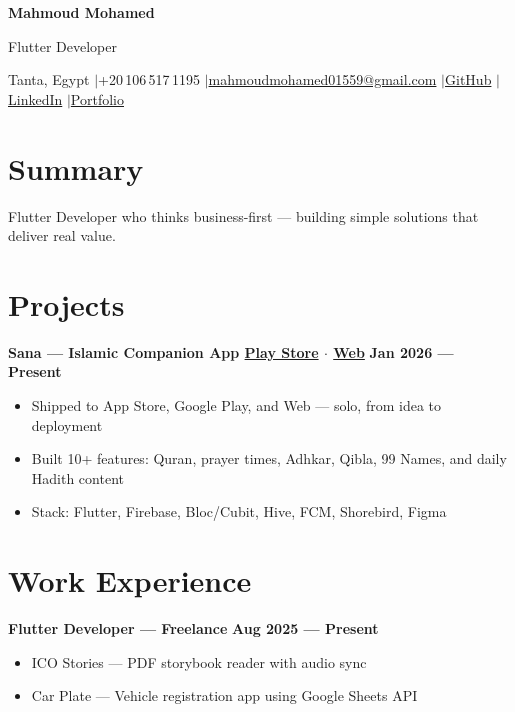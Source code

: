 \documentclass[a4paper,11pt]{article}
\newcommand{\entry}[2]{%
  \textbf{#1} \hfill \textbf{#2}%
}
\begin{document}
\noindent
{\LARGE\bfseries Mahmoud Mohamed}\par\vspace{1pt}
{\large Flutter Developer}\par\vspace{4pt}
{\small Tanta, Egypt \enspace$|$\enspace +20\,106\,517\,1195 \enspace$|$\enspace \href{mailto:mahmoudmohamed01559@gmail.com}{mahmoudmohamed01559@gmail.com} \enspace$|$\enspace \href{https://github.com/Korya0}{GitHub} \enspace$|$\enspace \href{https://www.linkedin.com/in/mahmoud-mohamed-5938ab28a/}{LinkedIn} \enspace$|$\enspace \href{https://aboard-drop-6d7.notion.site/Flutter-Developer-2427990c6fad808d8c72f2ebaabb3604?pvs=74}{Portfolio}}

\section{Summary}
\noindent Flutter Developer who thinks business-first --- building simple solutions that deliver real value.

\section{Projects}

\noindent\entry{Sana --- Islamic Companion App \small\href{https://play.google.com/store/apps/details?id=com.sana.muslim.app}{Play Store} $\cdot$ \href{https://sana0.vercel.app/\#/home}{Web}}{Jan 2026 --- Present}\\[1pt]
\begin{itemize}[leftmargin=0.2in, nosep, topsep=1pt, itemsep=1pt]
    \item Shipped to App Store, Google Play, and Web --- solo, from idea to deployment
    \item Built 10+ features: Quran, prayer times, Adhkar, Qibla, 99 Names, and daily Hadith content
    \item Stack: Flutter, Firebase, Bloc/Cubit, Hive, FCM, Shorebird, Figma
\end{itemize}

\section{Work Experience}

\noindent\entry{Flutter Developer --- Freelance}{Aug 2025 --- Present}\\[1pt]
\begin{itemize}[leftmargin=0.2in, nosep, topsep=1pt, itemsep=1pt]
    \item ICO Stories --- PDF storybook reader with audio sync
    \item Car Plate --- Vehicle registration app using Google Sheets API
\end{itemize}
\end{document}
